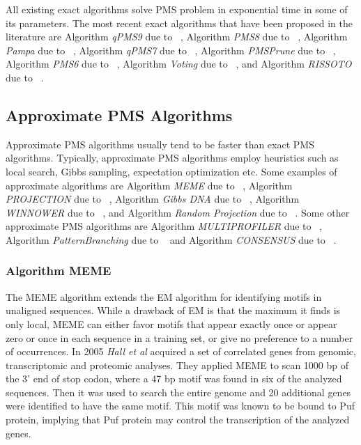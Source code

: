 All existing exact algorithms solve PMS problem in exponential time in some of its parameters. The most recent exact algorithms that have been proposed in the literature are Algorithm \textit{qPMS9} due to ~\cite{nicolae2015qpms9}, Algorithm \textit{PMS8} due to ~\cite{nicolae2014efficient}, Algorithm \textit{Pampa} due to ~\cite{davila2007pampa}, Algorithm \textit{qPMS7} due to ~\cite{dinh2012qpms7}, Algorithm \textit{PMSPrune} due to ~\cite{davila2007fast}, Algorithm \textit{PMS6} due to ~\cite{bandyopadhyay2013pms6mc}, Algorithm \textit{Voting} due to ~\cite{chin2005voting}, and Algorithm \textit{RISSOTO} due to ~\cite{pisanti2006risotto}.


\subsection{Approximate PMS Algorithms}
Approximate PMS algorithms usually tend to be faster than exact PMS algorithms. Typically, approximate PMS algorithms employ heuristics such as local search, Gibbs sampling, expectation optimization etc. Some examples of approximate algorithms are Algorithm \textit{MEME} due to ~\cite{bailey1994fitting}, Algorithm \textit{PROJECTION} due to ~\cite{buhler2002finding}, Algorithm \textit{Gibbs DNA} due to ~\cite{lawrence1993detecting}, Algorithm \textit{WINNOWER} due to ~\cite{pevzner2000combinatorial}, and Algorithm \textit{Random Projection} due to ~\cite{rocke1998algorithm}. Some other approximate PMS algorithms are Algorithm \textit{MULTIPROFILER} due to ~\cite{keich2002finding}, Algorithm \textit{PatternBranching} due to ~\cite{price2003finding} and Algorithm \textit{CONSENSUS} due to ~\cite{hertz1999identifying}.

\subsubsection{Algorithm MEME}
The MEME algorithm extends the EM algorithm for identifying motifs in unaligned sequences. While a drawback of EM is that the maximum it finds is only local, MEME can either favor motifs that appear exactly once or appear zero or once in each sequence in a training set, or give no preference to a number of occurrences. In 2005 \textit{Hall et al} acquired a set of correlated genes from genomic, transcriptomic and proteomic analyses. They applied MEME to scan 1000 bp of the 3' end of stop codon, where a 47 bp motif was found in six of the analyzed sequences. Then it was used to search the entire genome and 20 additional genes were identified to have the same motif. This motif was known to be bound to Puf protein, implying that Puf protein may control the transcription of the analyzed genes.

